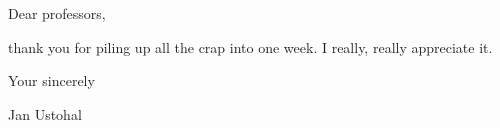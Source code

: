 \begin{post}
	\begin{content}
\begin{blockquote}Dear professors,

thank you for piling up all the crap into one week. I really, really appreciate it.

Your sincerely

{\hfill Jan Ustohal}
\end{blockquote}
	\end{content}
\end{post}
